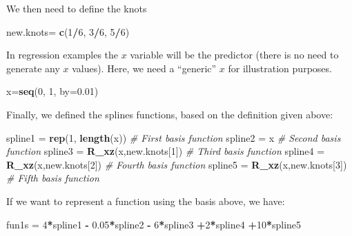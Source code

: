 \documentclass[
]{book}
\newenvironment{Shaded}{\begin{snugshade}}{\end{snugshade}}
\newcommand{\AttributeTok}[1]{\textcolor[rgb]{0.13,0.29,0.53}{#1}}
\newcommand{\CommentTok}[1]{\textcolor[rgb]{0.56,0.35,0.01}{\textit{#1}}}
\newcommand{\DecValTok}[1]{\textcolor[rgb]{0.00,0.00,0.81}{#1}}
\newcommand{\FloatTok}[1]{\textcolor[rgb]{0.00,0.00,0.81}{#1}}
\newcommand{\FunctionTok}[1]{\textcolor[rgb]{0.13,0.29,0.53}{\textbf{#1}}}
\newcommand{\NormalTok}[1]{#1}
\newcommand{\OtherTok}[1]{\textcolor[rgb]{0.56,0.35,0.01}{#1}}
\newcommand{\SpecialCharTok}[1]{\textcolor[rgb]{0.81,0.36,0.00}{\textbf{#1}}}
\begin{document}
We then need to define the knots

\begin{Shaded}
\begin{Highlighting}[]
\NormalTok{new.knots}\OtherTok{=} \FunctionTok{c}\NormalTok{(}\DecValTok{1}\SpecialCharTok{/}\DecValTok{6}\NormalTok{, }\DecValTok{3}\SpecialCharTok{/}\DecValTok{6}\NormalTok{, }\DecValTok{5}\SpecialCharTok{/}\DecValTok{6}\NormalTok{)}
\end{Highlighting}
\end{Shaded}

In regression examples the \(x\) variable will be the predictor (there is no need to generate any \(x\) values). Here, we need a ``generic'' \(x\) for illustration purposes.

\begin{Shaded}
\begin{Highlighting}[]
\NormalTok{x}\OtherTok{=}\FunctionTok{seq}\NormalTok{(}\DecValTok{0}\NormalTok{, }\DecValTok{1}\NormalTok{, }\AttributeTok{by=}\FloatTok{0.01}\NormalTok{)}
\end{Highlighting}
\end{Shaded}

Finally, we defined the splines functions, based on the definition given above:

\begin{Shaded}
\begin{Highlighting}[]
\NormalTok{spline1 }\OtherTok{=} \FunctionTok{rep}\NormalTok{(}\DecValTok{1}\NormalTok{, }\FunctionTok{length}\NormalTok{(x)) }\CommentTok{\# First basis function}
\NormalTok{spline2 }\OtherTok{=}\NormalTok{ x }\CommentTok{\# Second basis function}
\NormalTok{spline3 }\OtherTok{=} \FunctionTok{R\_xz}\NormalTok{(x,new.knots[}\DecValTok{1}\NormalTok{]) }\CommentTok{\# Third basis function }
\NormalTok{spline4 }\OtherTok{=} \FunctionTok{R\_xz}\NormalTok{(x,new.knots[}\DecValTok{2}\NormalTok{]) }\CommentTok{\# Fourth basis function }
\NormalTok{spline5 }\OtherTok{=} \FunctionTok{R\_xz}\NormalTok{(x,new.knots[}\DecValTok{3}\NormalTok{]) }\CommentTok{\# Fifth basis function }
\end{Highlighting}
\end{Shaded}

If we want to represent a function using the basis above, we have:

\begin{Shaded}
\begin{Highlighting}[]
\NormalTok{fun1s }\OtherTok{=} \DecValTok{4}\SpecialCharTok{*}\NormalTok{spline1 }\SpecialCharTok{{-}} \FloatTok{0.05}\SpecialCharTok{*}\NormalTok{spline2 }\SpecialCharTok{{-}} \DecValTok{6}\SpecialCharTok{*}\NormalTok{spline3 }\SpecialCharTok{+}\DecValTok{2}\SpecialCharTok{*}\NormalTok{spline4 }\SpecialCharTok{+}\DecValTok{10}\SpecialCharTok{*}\NormalTok{spline5}
\end{Highlighting}
\end{Shaded}
\end{document}
